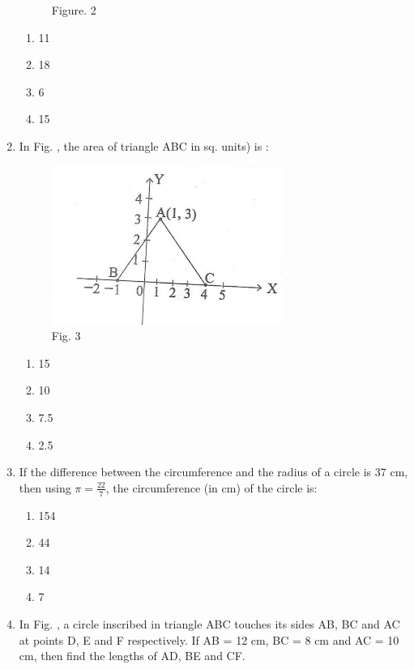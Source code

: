 \documentclass[10pt,-letter paper]{article}
\begin{document}
\begin{enumerate}
\begin{figure}
\caption{Figure. 2}
\label{fig2}
		\end{figure}
 \begin{enumerate}
    \item 11\\
    \item 18\\
    \item 6\\
    \item 15
 \end{enumerate}
 \item In Fig. , the area of triangle ABC in sq. units) is :
	\begin{figure}
		\centering
\includegraphics[width=0.5\columnwidth]{3.png}
\caption{Fig. 3}
\label{fig3}
	\end{figure}
 \begin{enumerate}
    \item 15\\
    \item 10\\
    \item 7.5\\
    \item 2.5
 \end{enumerate}
 \item If the difference between the circumference and the radius of a circle is 37 cm, then using $\pi=\frac{22}{7}$, the circumference (in cm) of the circle is:
 \begin{enumerate}
    \item 154\\
    \item 44\\
    \item 14\\
    \item 7
 \end{enumerate}
 \item In Fig. , a circle inscribed in triangle ABC touches its sides AB, BC and AC at points D, E and F respectively. If AB = 12 cm, BC = 8 cm and AC = 10 cm, then find the lengths of AD, BE and CF.

\end{enumerate}
\end{document}
